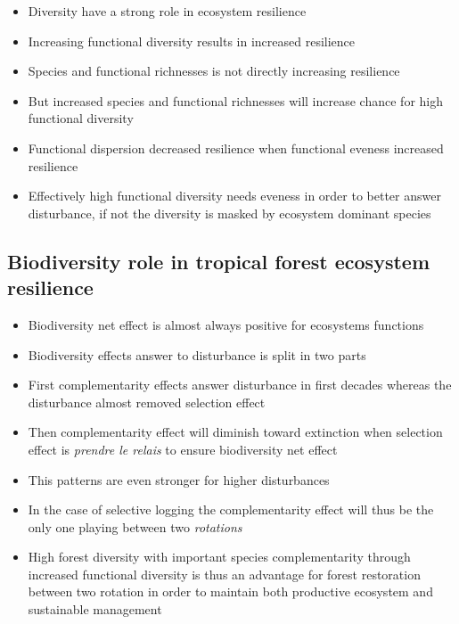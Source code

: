 \documentclass[12pt,]{article}
\providecommand{\tightlist}{%
\setlength{\itemsep}{0pt}\setlength{\parskip}{0pt}}
\theoremstyle{definition}
\theoremstyle{definition}
\theoremstyle{remark}
\begin{document}
\begin{itemize}
\tightlist
\item
  Diversity have a strong role in ecosystem resilience
\item
  Increasing functional diversity results in increased resilience
\item
  Species and functional richnesses is not directly increasing
  resilience
\item
  But increased species and functional richnesses will increase chance
  for high functional diversity
\item
  Functional dispersion decreased resilience when functional eveness
  increased resilience
\item
  Effectively high functional diversity needs eveness in order to better
  answer disturbance, if not the diversity is masked by ecosystem
  dominant species
\end{itemize}

\subsection{Biodiversity role in tropical forest ecosystem
resilience}\label{biodiversity-role-in-tropical-forest-ecosystem-resilience}

\begin{itemize}
\tightlist
\item
  Biodiversity net effect is almost always positive for ecosystems
  functions
\item
  Biodiversity effects answer to disturbance is split in two parts
\item
  First complementarity effects answer disturbance in first decades
  whereas the disturbance almost removed selection effect
\item
  Then complementarity effect will diminish toward extinction when
  selection effect is \emph{prendre le relais} to ensure biodiversity
  net effect
\item
  This patterns are even stronger for higher disturbances
\item
  In the case of selective logging the complementarity effect will thus
  be the only one playing between two \emph{rotations}
\item
  High forest diversity with important species complementarity through
  increased functional diversity is thus an advantage for forest
  restoration between two rotation in order to maintain both productive
  ecosystem and sustainable management
\end{itemize}
\end{document}

